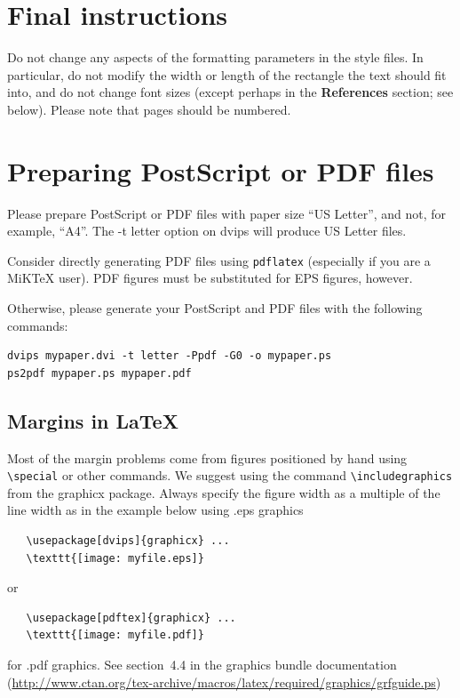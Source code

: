 \documentclass[10pt]{article} %
\begin{document}
\section{Final instructions}
Do not change any aspects of the formatting parameters in the style files.
In particular, do not modify the width or length of the rectangle the text
should fit into, and do not change font sizes (except perhaps in the
\textbf{References} section; see below). Please note that pages should be
numbered.

\section{Preparing PostScript or PDF files}

Please prepare PostScript or PDF files with paper size ``US Letter'', and
not, for example, ``A4''. The -t
letter option on dvips will produce US Letter files.

Consider directly generating PDF files using \verb+pdflatex+
(especially if you are a MiKTeX user).
PDF figures must be substituted for EPS figures, however.

Otherwise, please generate your PostScript and PDF files with the following commands:
\begin{verbatim}
dvips mypaper.dvi -t letter -Ppdf -G0 -o mypaper.ps
ps2pdf mypaper.ps mypaper.pdf
\end{verbatim}

\subsection{Margins in LaTeX}

Most of the margin problems come from figures positioned by hand using
\verb+\special+ or other commands. We suggest using the command
\verb+\includegraphics+
from the graphicx package. Always specify the figure width as a multiple of
the line width as in the example below using .eps graphics
\begin{verbatim}
   \usepackage[dvips]{graphicx} ...
   \texttt{[image: myfile.eps]}
\end{verbatim}
or %
\begin{verbatim}
   \usepackage[pdftex]{graphicx} ...
   \texttt{[image: myfile.pdf]}
\end{verbatim}
for .pdf graphics.
See section~4.4 in the graphics bundle documentation (\url{http://www.ctan.org/tex-archive/macros/latex/required/graphics/grfguide.ps})
\end{document}
